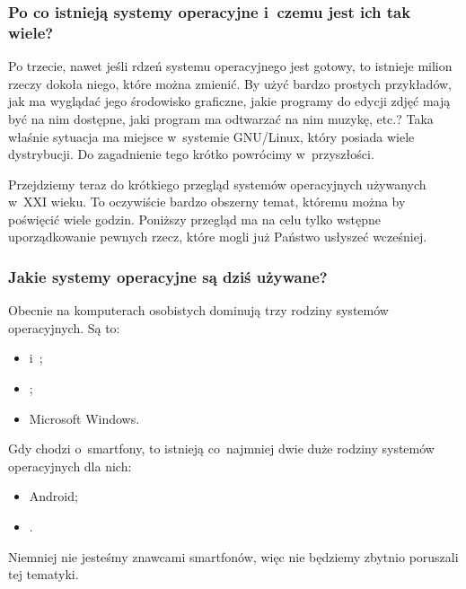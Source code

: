 \documentclass[10pt,t]{beamer}
\begin{document}
\begin{frame}
  \frametitle{Po co istnieją systemy operacyjne i~czemu jest ich
    tak wiele?}


  Po trzecie, nawet jeśli rdzeń systemu operacyjnego jest gotowy, to
  istnieje milion rzeczy dokoła niego, które można zmienić. By użyć bardzo
  prostych przykładów, jak ma wyglądać jego środowisko graficzne,
  jakie programy do edycji zdjęć mają być na nim dostępne, jaki program
  ma odtwarzać na nim muzykę, etc.? Taka właśnie sytuacja ma miejsce
  w~systemie GNU/Linux, który posiada wiele dystrybucji. Do zagadnienie
  tego krótko powrócimy w~przyszłości.

  Przejdziemy teraz do krótkiego przegląd systemów operacyjnych używanych
  w~XXI wieku. To oczywiście bardzo obszerny temat, któremu można by
  poświęcić wiele godzin. Poniższy przegląd ma na celu tylko wstępne
  uporządkowanie pewnych rzecz, które mogli już Państwo usłyszeć wcześniej.

\end{frame}





\begin{frame}
  \frametitle{Jakie systemy operacyjne są dziś używane?}


  Obecnie na komputerach osobistych dominują trzy rodziny systemów
  operacyjnych. Są to:
  \begin{itemize}

  \item {}
    i~;

  \item {};

  \item {}
    {Microsoft Windows}.

  \end{itemize}

  Gdy chodzi o~smartfony, to istnieją co~najmniej dwie duże rodziny systemów
  operacyjnych dla nich:
  \begin{itemize}

  \item
    {Android};

  \item {}.

  \end{itemize}
  Niemniej nie jesteśmy znawcami smartfonów, więc nie będziemy zbytnio
  poruszali tej tematyki.

\end{frame}
\end{document}
